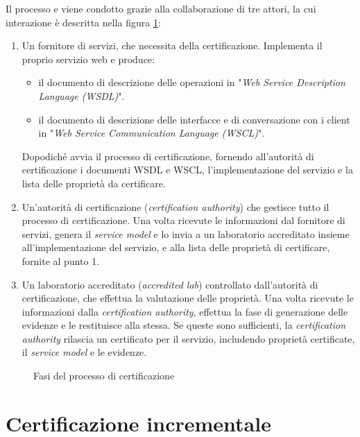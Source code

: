 Il processo  e viene condotto grazie alla collaborazione di tre attori, la cui interazione è descritta nella figura \ref{fig:CertSoaFig1b}:
\begin{enumerate}
\item Un fornitore di servizi, che necessita della certificazione. Implementa il proprio servizio web e produce:
\begin{itemize}
\item il documento di descrizione delle operazioni in "\textit{Web Service Description Language (WSDL)}".
\item il documento di descrizione delle interfacce e di conversazione con i client in "\textit{Web Service Communication Language (WSCL)}".
\end{itemize}
Dopodiché avvia il processo di certificazione, fornendo all'autorità di certificazione i documenti WSDL e WSCL, l'implementazione del servizio e la lista delle proprietà da certificare. 
\item Un'autorità di certificazione (\textit{certification authority}) che gestisce tutto il processo di certificazione. Una volta ricevute le informazioni dal fornitore di servizi, genera il \textit{service model} e lo invia a un laboratorio accreditato insieme all'implementazione del servizio, e alla lista delle proprietà di certificare, fornite al punto 1.
\item Un laboratorio accreditato (\textit{accredited lab}) controllato dall'autorità di certificazione, che  effettua la valutazione delle proprietà. Una volta ricevute le informazioni dalla \textit{certification authority}, effettua la fase di generazione delle evidenze e le restituisce alla stessa. Se queste sono sufficienti, la \textit{certification authority} rilascia un certificato per il servizio, includendo proprietà certificate, il \textit{service model} e le evidenze.
\end{enumerate}

\begin{figure}[H]
\centering
{}
\caption{Fasi del processo di certificazione\cite{CitCertSoa}}\label{fig:CertSoaFig1b}
\end{figure}

\section{Certificazione incrementale} %
